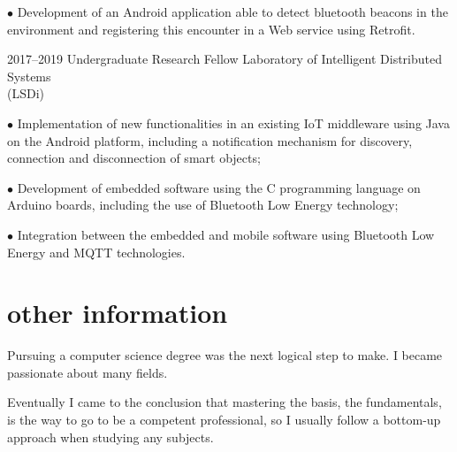\documentclass[]{../document-class/twentysecondcv}
\begin{document}
\begin{twenty}
{		$\bullet$ Development of an Android application able to detect bluetooth beacons in the environment and registering this encounter in a Web service using Retrofit.}

	\twentyitem
		{2017--2019} %
		{Undergraduate Research Fellow} %
		{Laboratory of Intelligent Distributed Systems \\\hspace*{\fill}(LSDi)}
		{$\bullet$ Implementation of new functionalities in an existing IoT middleware using Java on the Android platform, including a notification mechanism for discovery, connection and disconnection of smart objects;\vskip 4pt 


		$\bullet$ Development of embedded software using the C programming language on Arduino boards, including the use of Bluetooth Low Energy technology;\vskip 4pt 

		$\bullet$ Integration between the embedded and mobile software using Bluetooth Low Energy and MQTT technologies.}
		


\end{twenty}


\section{other information}

Pursuing a computer science degree was the next logical step to make. I became passionate about many fields.

Eventually I came to the conclusion that mastering the basis, the fundamentals, is the way to go to be a competent professional, so I usually follow a bottom-up approach when studying any subjects.




\end{document}
